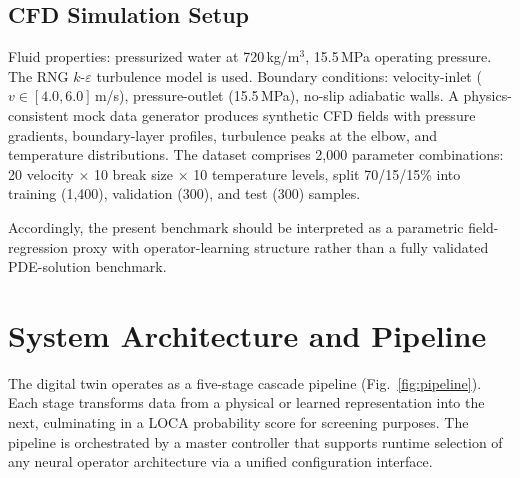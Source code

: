 \documentclass[conference]{IEEEtran}
\begin{document}
\subsection{CFD Simulation Setup}

Fluid properties: pressurized water at 720\,kg/m$^3$, 15.5\,MPa operating pressure. The RNG $k$-$\varepsilon$ turbulence model is used. Boundary conditions: velocity-inlet ($v \in [4.0, 6.0]$\,m/s), pressure-outlet (15.5\,MPa), no-slip adiabatic walls. A physics-consistent mock data generator produces synthetic CFD fields with pressure gradients, boundary-layer profiles, turbulence peaks at the elbow, and temperature distributions. The dataset comprises 2,000 parameter combinations: 20 velocity $\times$ 10 break size $\times$ 10 temperature levels, split 70/15/15\% into training (1,400), validation (300), and test (300) samples.

Accordingly, the present benchmark should be interpreted as a parametric field-regression proxy with operator-learning structure rather than a fully validated PDE-solution benchmark.

\section{System Architecture and Pipeline}
\label{sec:system}

The digital twin operates as a five-stage cascade pipeline (Fig.~\ref{fig:pipeline}). Each stage transforms data from a physical or learned representation into the next, culminating in a LOCA probability score for screening purposes. The pipeline is orchestrated by a master controller that supports runtime selection of any neural operator architecture via a unified configuration interface.
\end{document}
